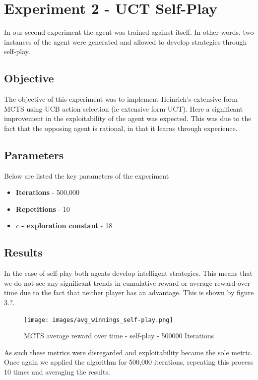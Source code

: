 \section{Experiment 2 - UCT Self-Play} \label{sec:experiment2}
In our second experiment the agent was trained against itself.
In other words, two instances of the agent were generated and allowed to develop strategies
through self-play.

\subsection{Objective}\label{subsec:objective2}
The objective of this experiment was to implement Heinrich's extensive form MCTS using UCB action
selection (ie extensive form UCT).
Here a significant improvement in the exploitability of the agent was expected.
This was due to the fact that the opposing agent is rational, in that it learns
through experience.


\subsection{Parameters}\label{subsec:algAndCoding2}
Below are listed the key parameters of the experiment
\begin{itemize}
    \item \textbf{Iterations} - 500,000
    \item \textbf{Repetitions} - 10
    \item \textbf{$c$ - exploration constant} - 18
\end{itemize}

\subsection{Results}\label{subsec:results2}
In the case of self-play both agents develop intelligent strategies.
This means that we do not see any significant trends in cumulative reward or average reward over time
due to the fact that neither player has an advantage.
This is shown by figure 3.?.
\begin{figure}[ht]
    \texttt{[image: images/avg\_winnings\_self-play.png]}
    \caption{MCTS average reward over time - self-play - 500000 Iterations}
\end{figure}
As such these metrics were disregarded and exploitability became the sole metric.
Once again we applied the algorithm for 500,000 iterations, repeating this process 10 times
and averaging the results.

